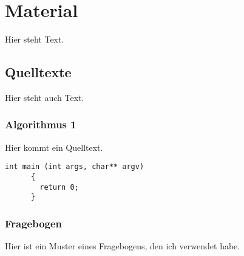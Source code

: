 \chapter{Material}

  Hier steht Text.

  \section{Quelltexte}

  Hier steht auch Text.

    \subsection{Algorithmus 1}

    Hier kommt ein Quelltext.

    \begin{lstlisting}[caption=Standard-Quelltext, label=simple_main]
      int main (int args, char** argv)
      {
        return 0;
      }
    \end{lstlisting}


    \subsection{Fragebogen}

    Hier ist ein Muster eines Fragebogens, den ich verwendet habe.